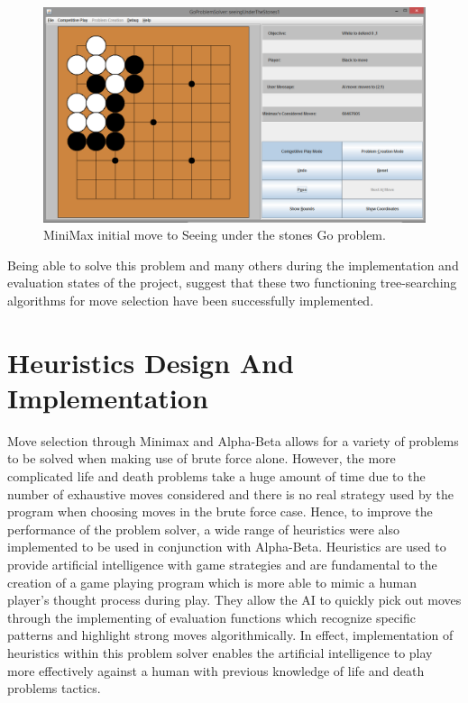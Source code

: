 \documentclass{l3proj}
\begin{document}
\begin{figure}[H]
\centering
\includegraphics[scale=0.5]{Images/UnderTheStones_Minimax.png}
\caption{MiniMax initial move to Seeing under the stones Go problem.}
\end{figure}

Being able to solve this problem and many others during the implementation and evaluation states of the project, suggest that these two functioning tree-searching algorithms for move selection have been successfully implemented. 

\section{Heuristics Design And Implementation}

Move selection through Minimax and Alpha-Beta allows for a variety of problems to be solved when making use of brute force alone. However, the more complicated life and death problems take a huge amount of time due to the number of exhaustive moves considered and there is no real strategy used by the program when choosing moves in the brute force case. Hence, to improve the performance of the problem solver, a wide range of heuristics were also implemented to be used in conjunction with Alpha-Beta. Heuristics are used to provide artificial intelligence with game strategies and are fundamental to the creation of a game playing program which is more able to mimic a human player's thought process during play. They allow the AI to quickly pick out moves through the implementing of evaluation functions which recognize specific patterns and highlight strong moves algorithmically. In effect, implementation of heuristics within this problem solver enables the artificial intelligence to play more effectively against a human with previous knowledge of life and death problems tactics.
\end{document}
